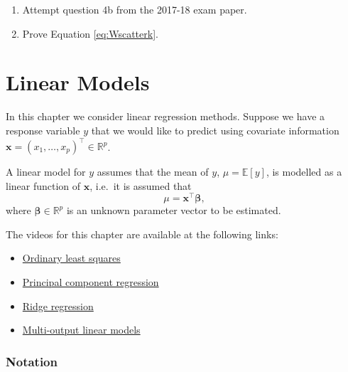 \documentclass[
]{book}
\providecommand{\tightlist}{%
  \setlength{\itemsep}{0pt}\setlength{\parskip}{0pt}}
\theoremstyle{definition}
\theoremstyle{definition}
\theoremstyle{definition}
\theoremstyle{definition}
\theoremstyle{remark}
\begin{document}
\begin{enumerate}
\def\labelenumi{\arabic{enumi}.}
\setcounter{enumi}{1}
\item
  Attempt question 4b from the 2017-18 exam paper.
\item
  Prove Equation \eqref{eq:Wscatterk}.
\end{enumerate}

\hypertarget{lm}{%
\chapter{Linear Models}\label{lm}}

In this chapter we consider linear regression methods. Suppose we have a response variable \(y\) that we would like to predict using covariate information \(\mathbf x=(x_1, \ldots, x_p)^\top \in \mathbb{R}^p\).

A linear model for \(y\) assumes that the mean of \(y\), \(\mu={\mathbb{E}}[y]\), is modelled as a linear function of \(\mathbf x\), i.e.~it is assumed that
\[
\mu = \mathbf x^\top \boldsymbol \beta,
\]
where \(\boldsymbol \beta\in \mathbb{R}^p\) is an unknown parameter vector to be estimated.

The videos for this chapter are available at the following links:

\begin{itemize}
\tightlist
\item
  \href{https://mediaspace.nottingham.ac.uk/media/Linear+ModelsA+Ordinary+Least+Squares/1_ytvk0uc6}{Ordinary least squares}
\item
  \href{https://mediaspace.nottingham.ac.uk/media/Linear+ModelsA+Principal+Component+Regression/1_h0l11uvw}{Principal component regression}
\item
  \href{https://mediaspace.nottingham.ac.uk/media/Linear+ModelsA+Ridge+Regression/1_rjnxkukd}{Ridge regression}
\item
  \href{https://mediaspace.nottingham.ac.uk/media/Linear+modelsA+multi-output+models/1_f61kjm7u}{Multi-output linear models}
\end{itemize}

\hypertarget{notation-3}{%
\subsection*{Notation}\label{notation-3}}
\end{document}

